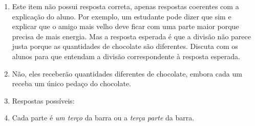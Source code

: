 \documentclass[10 pt,usenames,dvipsnames, oneside]{article}
\begin{document}
\ifdefined\prof

\begin{solucao}

\begin{enumerate}[label=\alph*),wide,labelindent=0pt] %
    \item       Este item não possui resposta correta, apenas respostas coerentes com a explicação do aluno. Por exemplo, um estudante pode dizer que sim e explicar que o amigo mais velho deve ficar com uma parte maior porque precisa de mais energia. Mas a resposta esperada é que a divisão não parece justa porque as quantidades de chocolate são diferentes. Discuta com os alunos para que entendam a divisão correspondente à resposta esperada.
    \item Não, eles receberão quantidades diferentes de chocolate, embora cada um receba um único pedaço do chocolate.
    \item Respostas possíveis:

\begin{center}
\end{center}
    \item       Cada parte é {\it um terço} da barra ou a {\it terça parte} da barra.
\end{enumerate} %

\end{solucao}
\fi
\end{document}
